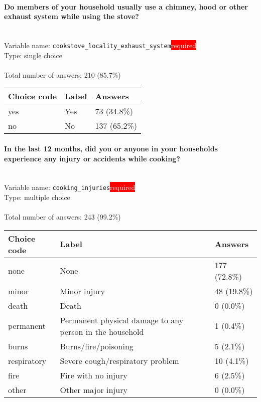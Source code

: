 \documentclass[11.5pt, a4paper]{scrartcl}
\begin{document}
\paragraph{Do members of your household usually use a chimney, hood or other exhaust system while using the stove? }
\  \\Variable name: \texttt{cookstove\_locality\_exhaust\_system}\hfill\colorbox{red}{\small{\textcolor{white}{required}}}\\
 Type: single choice\\
\\Total number of answers: 210 (85.7\%)
\\[0.2em] \begin{tabular}{p{4cm}|p{8cm}|p{3cm}}
Choice code & Label & Answers \\
\hline
yes & Yes& \cellcolor{color1}73 (34.8\%)\\
\cellcolor{mygray} no & \cellcolor{mygray}No & \cellcolor{color3}137 (65.2\%)\\
\end{tabular}
\paragraph{In the last 12 months, did you or anyone in your  households experience any injury or accidents while cooking?}
\  \\Variable name: \texttt{cooking\_injuries}\hfill\colorbox{red}{\small{\textcolor{white}{required}}}\\
 Type: multiple choice\\
\\Total number of answers: 243 (99.2\%)
\\[0.2em] \begin{tabular}{p{4cm}|p{8cm}|p{3cm}}
Choice code & Label & Answers \\
\hline
none & None& \cellcolor{color3}177 (72.8\%)\\
\cellcolor{mygray} minor & \cellcolor{mygray}Minor injury & \cellcolor{color0}48 (19.8\%)\\
death & Death & \cellcolor{color0}0 (0.0\%)\\
\cellcolor{mygray} permanent & \cellcolor{mygray}Permanent physical damage to any person in the household & \cellcolor{color0}1 (0.4\%)\\
burns & Burns/fire/poisoning& \cellcolor{color0}5 (2.1\%)\\
\cellcolor{mygray} respiratory & \cellcolor{mygray}Severe cough/respiratory problem & \cellcolor{color0}10 (4.1\%)\\
fire & Fire with no injury& \cellcolor{color0}6 (2.5\%)\\
\cellcolor{mygray} other & \cellcolor{mygray}Other major injury & \cellcolor{color0}0 (0.0\%)\\
\end{tabular}
\end{document}
